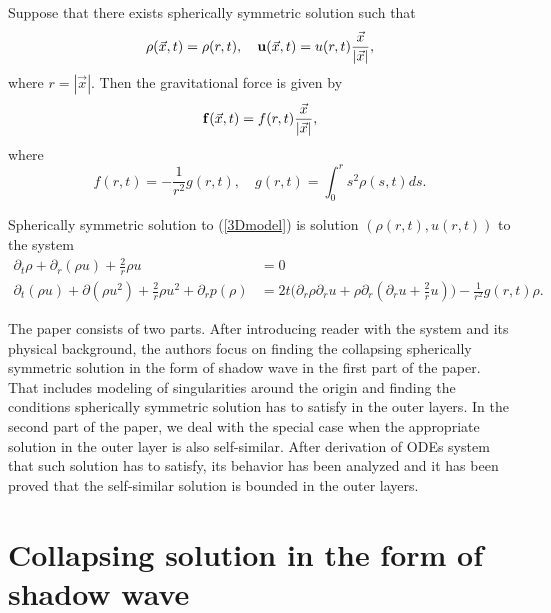\documentclass[reqno]{article}%
\theoremstyle{plain}
\theoremstyle{definition}
\theoremstyle{remark}
\numberwithin{equation}{section}
\begin{document}
Suppose that there exists spherically symmetric solution such that
\[\rho(\vec{x},t)=\rho(r,t),\quad {\bf u}(\vec{x},t)=u(r,t)\frac{\vec{x}}{|\vec{x}|},\]
where $r=|\vec{x}|$.
Then the gravitational force is given by 
\[{\bf f}(\vec{x},t)=f(r,t)\frac{\vec{x}}{|\vec{x}|},\]
where
\[f(r,t)=-\frac{1}{r^2}g(r,t),\quad g(r,t)=\int_0^r s^2 \rho(s,t)ds.\]

Spherically symmetric solution to  (\ref{3Dmodel}) is solution $(\rho(r,t),u(r,t))$ to the system
\begin{equation}\label{rad_sys}
\begin{split}
\partial_t \rho+\partial_r(\rho u)+\frac{2}{r}\rho u &=0\\
\partial_t(\rho u)+\partial(\rho u^2)+\frac{2}{r}\rho u^2+\partial_r p(\rho)&=2t \Big(\partial_r \rho \partial_r u+\rho\partial_r(\partial_r u+\frac{2}{r}u)\Big)-\frac{1}{r^2}g(r,t)\rho.
\end{split}
\end{equation}


The paper consists of two  parts. After introducing reader with the system and its physical background,  the authors focus on finding the collapsing spherically symmetric solution in the form of shadow wave in the first part of the paper. That includes  modeling of singularities around the origin and finding the conditions  spherically symmetric solution has to satisfy in the outer layers. In the second part of the paper, we deal with the special case when the appropriate solution in the outer layer is also self-similar. After derivation of ODEs system that such  solution has to satisfy, its behavior has been analyzed and it has been proved that the self-similar solution is bounded in the outer layers. 

\medskip

\section{Collapsing solution in the form of shadow wave}
\end{document}
